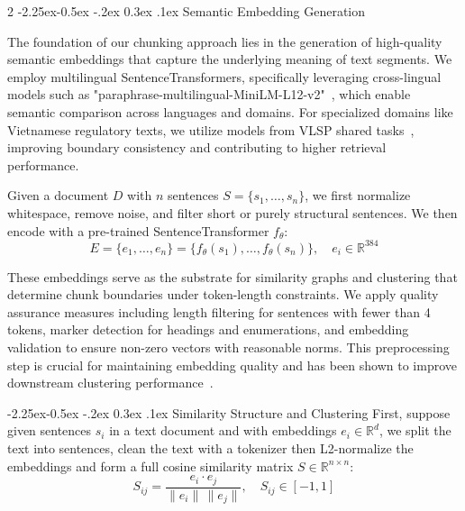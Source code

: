 \documentclass[10pt,letterpaper]{article}
\makeatletter
\let\cite\citep
\renewcommand{\subsubsection}{\@startsection{subsubsection}{3}{\z@}%
                                     {-2.25ex\@plus -0.5ex \@minus -.2ex}%
                                     {0.3ex \@plus .1ex}%
                                     {\normalfont\normalsize\itshape}}
\makeatother
\begin{document}
\begin{multicols}{2}
\subsubsection{Semantic Embedding Generation}

The foundation of our chunking approach lies in the generation of high-quality semantic embeddings that capture the underlying meaning of text segments. We employ multilingual SentenceTransformers, specifically leveraging cross-lingual models such as "paraphrase-multilingual-MiniLM-L12-v2"~\cite{reimers2019sentence}, which enable semantic comparison across languages and domains. For specialized domains like Vietnamese regulatory texts, we utilize models from VLSP shared tasks~\cite{nguyen2020underthesea}, improving boundary consistency and contributing to higher retrieval performance.

Given a document $D$ with $n$ sentences $S=\{s_1,\dots,s_n\}$, we first normalize whitespace, remove noise, and filter short or purely structural sentences. We then encode with a pre-trained SentenceTransformer $f_\theta$:
$$E=\{e_1,\dots,e_n\}=\{f_\theta(s_1),\dots,f_\theta(s_n)\},\quad e_i\in\mathbb{R}^{384}$$

These embeddings serve as the substrate for similarity graphs and clustering that determine chunk boundaries under token-length constraints. We apply quality assurance measures including length filtering for sentences with fewer than 4 tokens, marker detection for headings and enumerations, and embedding validation to ensure non-zero vectors with reasonable norms. This preprocessing step is crucial for maintaining embedding quality and has been shown to improve downstream clustering performance~\cite{zhang2024semantic,liu2024impact}.

\subsubsection{Similarity Structure and Clustering}
First, suppose given sentences $s_i$ in a text document and with embeddings $e_i\in\mathbb{R}^d$, we split the text into sentences, clean the text with a tokenizer then L2-normalize the embeddings and form a full cosine similarity matrix $S\in\mathbb{R}^{n\times n}$:
\begin{equation}
S_{ij}=\frac{e_i\cdot e_j}{\lVert e_i\rVert\,\lVert e_j\rVert},\quad S_{ij}\in[-1,1]
\end{equation}


\end{multicols}
\end{document}
